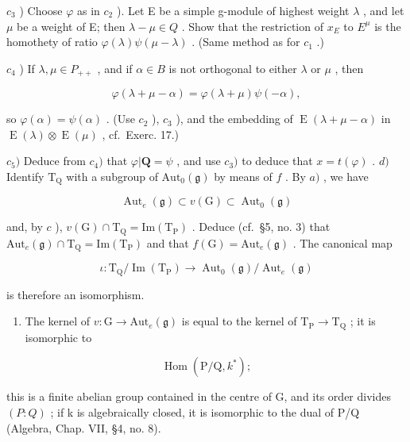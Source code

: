 \(c_{3}\) ) Choose \(\varphi\) as in \(c_{2}\) ). Let E be a simple g-module of highest weight \(\lambda\) , and let \(\mu\) be a weight of E; then \(\lambda - \mu \in Q\) . Show that the restriction of \(x_{E}\) to \(E^{\mu}\) is the homothety of ratio \(\varphi(\lambda)\psi(\mu - \lambda)\) . (Same method as for \(c_{1}\) .)

\(c_{4}\) ) If \(\lambda, \mu \in P_{++}\) , and if \(\alpha \in B\) is not orthogonal to either \(\lambda\) or \(\mu\) , then

\[
\varphi (\lambda + \mu - \alpha) = \varphi (\lambda + \mu) \psi (- \alpha),
\]

so \(\varphi (\alpha) = \psi (\alpha)\) . (Use \(c_{2}\) ), \(c_{3}\) ), and the embedding of \(\operatorname {E}(\lambda +\mu -\alpha)\) in \(\operatorname {E}(\lambda)\otimes \operatorname {E}(\mu)\) , cf.~Exerc. 17.)

\(c_{5})\) Deduce from \(c_{4})\) that \(\varphi|\mathbf{Q}=\psi\) , and use \(c_{3})\) to deduce that \(x=t(\varphi)\) . \(d)\) Identify \(\mathrm{T}_{\mathrm{Q}}\) with a subgroup of \(\mathrm{Aut}_{0}(\mathfrak{g})\) by means of \(f\) . By \(a)\) , we have

\[
\operatorname{Aut} _ {e} (\mathfrak {g}) \subset v (\mathrm{G}) \subset \operatorname{Aut} _ {0} (\mathfrak {g})
\]

and, by \(c\) ), \(v(\mathrm{G}) \cap \mathrm{T}_{\mathrm{Q}} = \mathrm{Im}(\mathrm{T}_{\mathrm{P}})\) . Deduce (cf.~§5, no. 3) that \(\mathrm{Aut}_e(\mathfrak{g}) \cap \mathrm{T}_{\mathrm{Q}} = \mathrm{Im}(\mathrm{T}_{\mathrm{P}})\) and that \(f(\mathrm{G}) = \mathrm{Aut}_e(\mathfrak{g})\) . The canonical map

\[
\iota : \mathrm{T} _ {\mathrm{Q}} / \operatorname{Im} (\mathrm{T} _ {\mathrm{P}}) \to \operatorname{Aut} _ {0} (\mathfrak {g}) / \operatorname{Aut} _ {e} (\mathfrak {g})
\]

is therefore an isomorphism.

\begin{enumerate}
\def\labelenumi{\alph{enumi})}
\setcounter{enumi}{4}
\tightlist
\item
  The kernel of \(v: \mathrm{G} \to \mathrm{Aut}_e(\mathfrak{g})\) is equal to the kernel of \(\mathrm{T}_{\mathrm{P}} \to \mathrm{T}_{\mathrm{Q}}\) ; it is isomorphic to
\end{enumerate}

\[
\operatorname{Hom} (\mathrm{P} / \mathrm{Q}, k ^ {*});
\]

this is a finite abelian group contained in the centre of G, and its order divides \((P:Q)\) ; if k is algebraically closed, it is isomorphic to the dual of P/Q (Algebra, Chap. VII, §4, no. 8).

